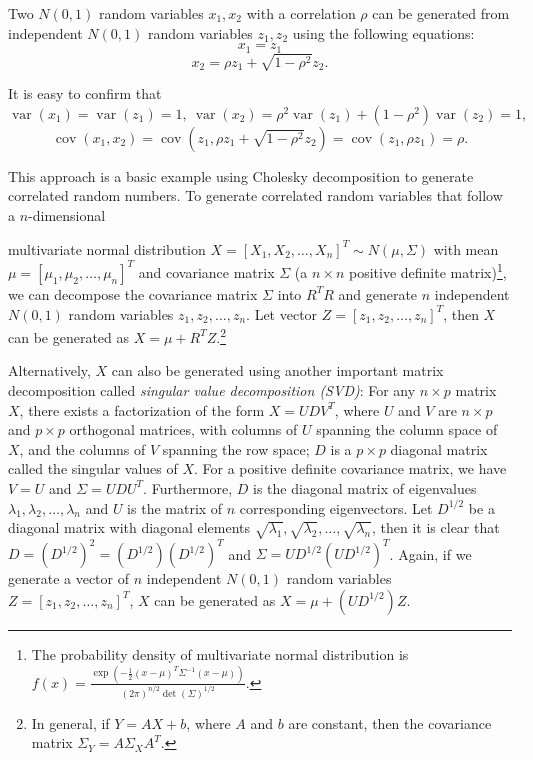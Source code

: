 \begin{solution}
Two \(N(0,1)\) random variables \(x_1,x_2\) with a correlation \(\rho\) can be generated from independent \(N(0,1)\) random variables \(z_1,z_2\) using the following equations:
\[
x_1=z_1
\]
\[
x_2=\rho z_1+\sqrt{1-\rho^2}z_2.
\]

It is easy to confirm that \(\operatorname{var}(x_1)=\operatorname{var}(z_1)=1,\ \operatorname{var}(x_2)=\rho^2\operatorname{var}(z_1)+(1-\rho^2)\operatorname{var}(z_2)=1,\)
\[
\operatorname{cov}(x_1,x_2)=\operatorname{cov}(z_1,\rho z_1+\sqrt{1-\rho^2}z_2)=\operatorname{cov}(z_1,\rho z_1)=\rho.
\]

This approach is a basic example using Cholesky decomposition to generate correlated random numbers. To generate correlated random variables that follow a \(n\)-dimensional

multivariate normal distribution \(X=[X_1,X_2,\ldots,X_n]^T\sim N(\mu,\Sigma)\) with mean \(\mu=[\mu_1,\mu_2,\ldots,\mu_n]^T\) and covariance matrix \(\Sigma\) (a \(n\times n\) positive definite matrix)\footnote[18]{The probability density of multivariate normal distribution is \(\displaystyle f(x)=\frac{\exp\left(-\frac{1}{2}(x-\mu)^T\Sigma^{-1}(x-\mu)\right)}{(2\pi)^{n/2}\det(\Sigma)^{1/2}}.\)}, we can decompose the covariance matrix \(\Sigma\) into \(R^T R\) and generate \(n\) independent \(N(0,1)\) random variables \(z_1,z_2,\ldots,z_n\). Let vector \(Z=[z_1,z_2,\ldots,z_n]^T\), then \(X\) can be generated as \(X=\mu+R^T Z\).\footnote[19]{In general, if \(Y=AX+b\), where \(A\) and \(b\) are constant, then the covariance matrix \(\Sigma_Y=A\Sigma_X A^T\).}

Alternatively, \(X\) can also be generated using another important matrix decomposition called \emph{singular value decomposition (SVD)}: For any \(n\times p\) matrix \(X\), there exists a factorization of the form \(X=UDV^T\), where \(U\) and \(V\) are \(n\times p\) and \(p\times p\) orthogonal matrices, with columns of \(U\) spanning the column space of \(X\), and the columns of \(V\) spanning the row space; \(D\) is a \(p\times p\) diagonal matrix called the singular values of \(X\). For a positive definite covariance matrix, we have \(V=U\) and \(\Sigma=UDU^T\). Furthermore, \(D\) is the diagonal matrix of eigenvalues \(\lambda_1,\lambda_2,\ldots,\lambda_n\) and \(U\) is the matrix of \(n\) corresponding eigenvectors. Let \(D^{1/2}\) be a diagonal matrix with diagonal elements \(\sqrt{\lambda_1},\sqrt{\lambda_2},\ldots,\sqrt{\lambda_n}\), then it is clear that \(D=(D^{1/2})^2=(D^{1/2})(D^{1/2})^T\) and \(\Sigma=UD^{1/2}(UD^{1/2})^T\). Again, if we generate a vector of \(n\) independent \(N(0,1)\) random variables \(Z=[z_1,z_2,\ldots,z_n]^T\), \(X\) can be generated as \(X=\mu+(UD^{1/2})Z\).
\end{solution}
